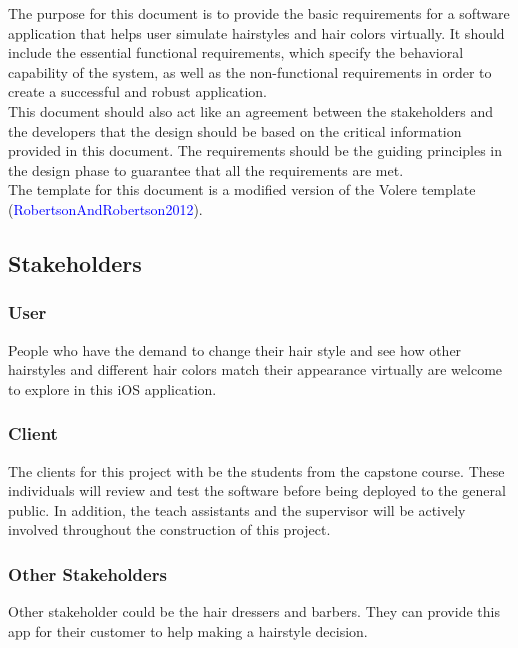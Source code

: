 \documentclass[12pt]{article}
\begin{document}
The purpose for this document is to provide the basic requirements for a software application that helps user simulate hairstyles and hair colors virtually. It should include the essential functional requirements, which specify the behavioral capability of the system, as well as the non-functional requirements in order to create a successful and robust application. \\
\newline
\noindent
This document should also act like an agreement between the stakeholders and the developers that the design should be based on the critical information provided in this document. The requirements should be the guiding principles in the design phase to guarantee that all the requirements are met. \\
\newline
The template for this document is a modified version 
of the Volere template (\textcolor{blue}{RobertsonAndRobertson2012}).

\subsection{Stakeholders}
\subsubsection{User}
\item People who have the demand to change their hair style and see how other hairstyles and different hair colors match their appearance virtually are welcome to explore in this iOS application.

\subsubsection{Client}

The clients for this project with be the students from the capstone course. These individuals will review and test the software before being deployed to the general public. In addition, the teach assistants and the supervisor will be actively involved throughout
the construction of this project.

\subsubsection{Other Stakeholders}
Other stakeholder could be the hair dressers and barbers. They can provide this app for their customer to help making a hairstyle decision.
\end{document}
